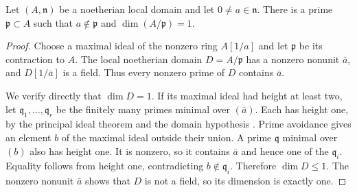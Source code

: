\begin{lemma}\label{C:local-curve-avoidance}
Let $(A,\mathfrak n)$ be a noetherian local domain and let
$0\ne a\in\mathfrak n$. There is a prime $\mathfrak p\subset A$
such that $a\notin\mathfrak p$ and $\dim(A/\mathfrak p)=1$.
\end{lemma}
\begin{proof}
Choose a maximal ideal of the nonzero ring $A[1/a]$ and let
$\mathfrak p$ be its contraction to $A$. The local noetherian domain
$D=A/\mathfrak p$ has a nonzero nonunit $\bar a$, and
$D[1/\bar a]$ is a field. Thus every nonzero prime of $D$ contains
$\bar a$.

We verify directly that $\dim D=1$. If its maximal ideal had height
at least two, let $\mathfrak q_1,\ldots,\mathfrak q_r$ be the
finitely many primes minimal over $(\bar a)$. Each has height one,
by the principal ideal theorem and the domain hypothesis
\cite[Tag~00KV]{BStacks}. Prime avoidance
\cite[Tag~00DS]{BStacks} gives an element $b$ of the maximal ideal outside their
union. A prime $\mathfrak q$ minimal over $(b)$ also has height one.
It is nonzero, so it contains $\bar a$ and hence one of the
$\mathfrak q_i$. Equality follows from height one, contradicting
$b\notin\mathfrak q_i$. Therefore $\dim D\le1$. The nonzero
nonunit $\bar a$ shows that $D$ is not a field, so its dimension is
exactly one.
\end{proof}

